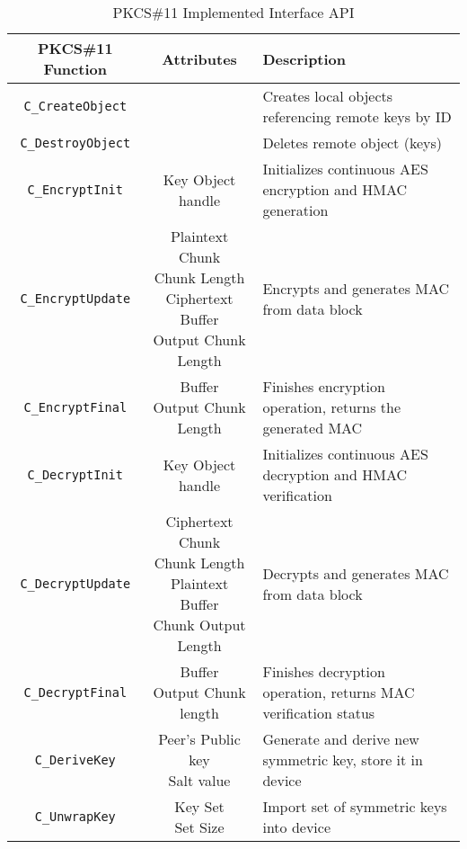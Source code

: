 \begin{table}[]
\centering
\def\arraystretch{1.5}
	\begin{tabular}{|c|c|l|}
	\hline
	\textbf{PKCS\#11 Function} & \textbf{Attributes} & \textbf{Description} \\ \hline
	\texttt{C\_CreateObject}	& & Creates local objects referencing remote keys by ID \\ \hline
	\texttt{C\_DestroyObject}	& & Deletes remote object (keys)\\ \hline
	\texttt{C\_EncryptInit}		& Key Object handle & Initializes continuous AES encryption and HMAC generation \\ \hline
	\texttt{C\_EncryptUpdate}	& \makecell{Plaintext Chunk\\Chunk Length\\Ciphertext Buffer\\Output Chunk Length} & Encrypts and generates MAC from data block \\ \hline
	\texttt{C\_EncryptFinal}	& \makecell{Buffer\\Output Chunk Length} & Finishes encryption operation, returns the generated MAC\\ \hline
	\texttt{C\_DecryptInit}		& Key Object handle & Initializes continuous AES decryption and HMAC verification\\ \hline
	\texttt{C\_DecryptUpdate}	& \makecell{Ciphertext Chunk\\Chunk Length\\Plaintext Buffer\\Chunk Output Length} & Decrypts and generates MAC from data block\\ \hline
	\texttt{C\_DecryptFinal}	& \makecell{Buffer\\Output Chunk length} & Finishes decryption operation, returns MAC verification status\\ \hline
	\texttt{C\_DeriveKey}		& \makecell{Peer's Public key\\Salt value} & Generate and derive new symmetric key, store it in device \\ \hline
	\texttt{C\_UnwrapKey}		& \makecell{Key Set\\Set Size} & Import set of symmetric keys into device\\ \hline
\end{tabular}
\caption{PKCS\#11 Implemented Interface API}
\label{tab:pkcs11-api}
\end{table}
